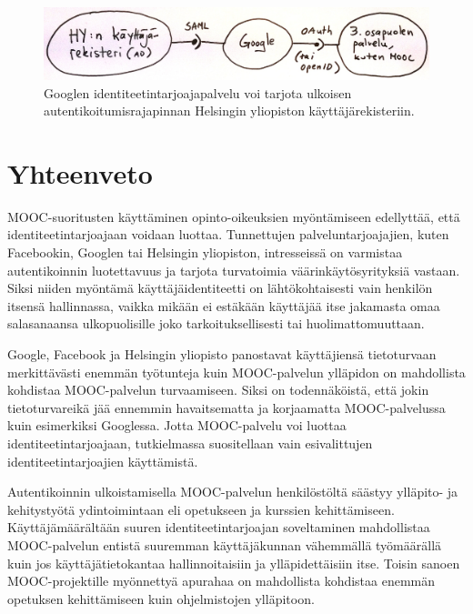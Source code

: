 \documentclass[finnish,gradu]{tktltiki}
\begin{document}
  \begin{figure}[h!]
    \centering
    \includegraphics[width=1.0\textwidth]{images/jatkokehitys-idp.jpg}
    \caption[Google välittäjäpalveluna Helsingin yliopiston käyttäjätunnuksille]{Googlen identiteetintarjoajapalvelu voi tarjota ulkoisen autentikoitumisrajapinnan Helsingin yliopiston käyttäjärekisteriin.}
    \label{fig:google-hy-idp}
  \end{figure}






\newpage
\section{Yhteenveto} %
\label{sec:yhteenveto}

  MOOC-suoritusten käyttäminen opinto-oikeuksien myöntämiseen edellyttää, että identiteetintarjoajaan voidaan luottaa. Tunnettujen palveluntarjoajajien, kuten Facebookin, Googlen tai Helsingin yliopiston, intresseissä on varmistaa autentikoinnin luotettavuus ja tarjota turvatoimia väärinkäytösyrityksiä vastaan. Siksi niiden myöntämä käyttäjäidentiteetti on lähtökohtaisesti vain henkilön itsensä hallinnassa, vaikka mikään ei estäkään käyttäjää itse jakamasta omaa salasanaansa ulkopuolisille joko tarkoituksellisesti tai huolimattomuuttaan.

  Google, Facebook ja Helsingin yliopisto panostavat käyttäjiensä tietoturvaan merkittävästi enemmän työtunteja kuin MOOC-palvelun ylläpidon on mahdollista kohdistaa MOOC-palvelun turvaamiseen. Siksi on todennäköistä, että jokin tietoturvareikä jää ennemmin havaitsematta ja korjaamatta MOOC-palvelussa kuin esimerkiksi Googlessa. Jotta MOOC-palvelu voi luottaa identiteetintarjoajaan, tutkielmassa suositellaan vain esivalittujen identiteetintarjoajien käyttämistä.

  Autentikoinnin ulkoistamisella MOOC-palvelun henkilöstöltä säästyy ylläpito- ja kehitystyötä ydintoimintaan eli opetukseen ja kurssien kehittämiseen. Käyttäjämäärältään suuren identiteetintarjoajan soveltaminen mahdollistaa MOOC-palvelun entistä suuremman käyttäjäkunnan vähemmällä työmäärällä kuin jos käyttäjätietokantaa hallinnoitaisiin ja ylläpidettäisiin itse. Toisin sanoen MOOC-projektille myönnettyä apurahaa on mahdollista kohdistaa enemmän opetuksen kehittämiseen kuin ohjelmistojen ylläpitoon.
\end{document}

